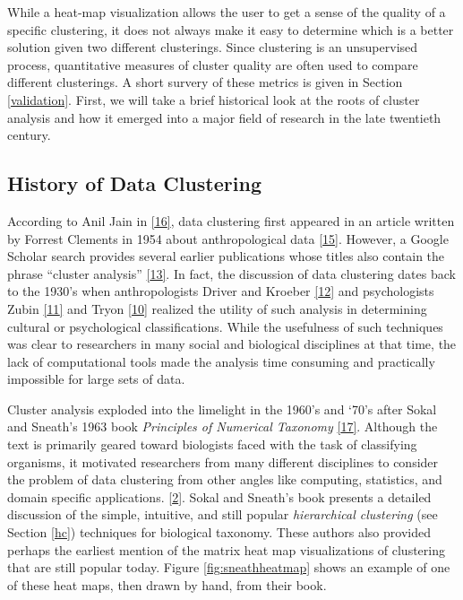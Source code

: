 \documentclass[
]{article}
\theoremstyle{definition}
\theoremstyle{definition}
\theoremstyle{definition}
\theoremstyle{definition}
\theoremstyle{remark}
\begin{document}
While a heat-map visualization allows the user to get a sense of the quality of a specific clustering, it does not always make it easy to determine which is a better solution given two different clusterings. Since clustering is an unsupervised process, quantitative measures of cluster quality are often used to compare different clusterings. A short survery of these metrics is given in Section \ref{validation}. First, we will take a brief historical look at the roots of cluster analysis and how it emerged into a major field of research in the late twentieth century.

\hypertarget{history-of-data-clustering}{%
\subsection{History of Data Clustering}\label{history-of-data-clustering}}

According to Anil Jain in \protect\hyperlink{ref-jain50}{{[}16{]}}, data clustering first appeared in an article written by Forrest Clements in 1954 about anthropological data \protect\hyperlink{ref-1954anthro}{{[}15{]}}. However, a Google Scholar search provides several earlier publications whose titles also contain the phrase ``cluster analysis'' \protect\hyperlink{ref-1952adcock}{{[}13{]}}. In fact, the discussion of data clustering dates back to the 1930's when anthropologists Driver and Kroeber \protect\hyperlink{ref-1932driver}{{[}12{]}} and psychologists Zubin \protect\hyperlink{ref-1938zubin}{{[}11{]}} and Tryon \protect\hyperlink{ref-1939tryon}{{[}10{]}} realized the utility of such analysis in determining cultural or psychological classifications. While the usefulness of such techniques was clear to researchers in many social and biological disciplines at that time, the lack of computational tools made the analysis time consuming and practically impossible for large sets of data.

Cluster analysis exploded into the limelight in the 1960's and `70's after Sokal and Sneath's 1963 book \emph{Principles of Numerical Taxonomy} \protect\hyperlink{ref-sokal}{{[}17{]}}. Although the text is primarily geared toward biologists faced with the task of classifying organisms, it motivated researchers from many different disciplines to consider the problem of data clustering from other angles like computing, statistics, and domain specific applications. \protect\hyperlink{ref-bock}{{[}2{]}}. Sokal and Sneath's book presents a detailed discussion of the simple, intuitive, and still popular \emph{hierarchical clustering} (see Section \ref{hc}) techniques for biological taxonomy. These authors also provided perhaps the earliest mention of the matrix heat map visualizations of clustering that are still popular today. Figure \ref{fig:sneathheatmap} shows an example of one of these heat maps, then drawn by hand, from their book.
\end{document}
